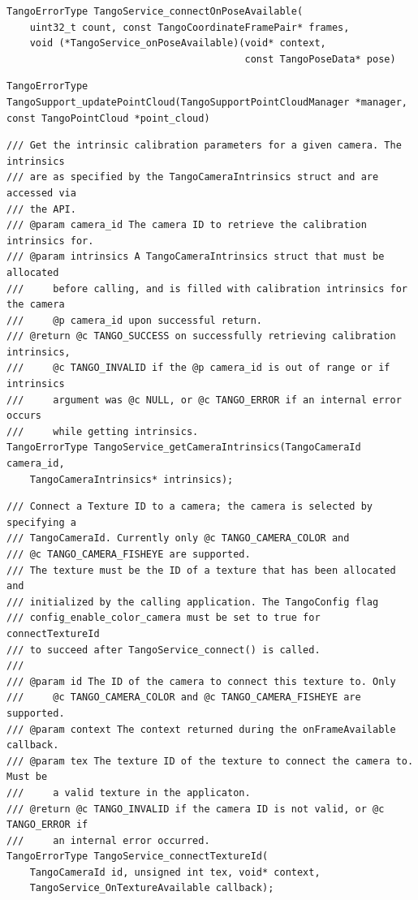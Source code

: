 \documentclass[12pt,twoside]{article}
\begin{document}
\begin{lstlisting}
TangoErrorType TangoService_connectOnPoseAvailable(
    uint32_t count, const TangoCoordinateFramePair* frames,
    void (*TangoService_onPoseAvailable)(void* context,
                                         const TangoPoseData* pose)
\end{lstlisting}

\begin{lstlisting}
TangoErrorType TangoSupport_updatePointCloud(TangoSupportPointCloudManager *manager, const TangoPointCloud *point_cloud)
\end{lstlisting}

\begin{lstlisting}
/// Get the intrinsic calibration parameters for a given camera. The intrinsics
/// are as specified by the TangoCameraIntrinsics struct and are accessed via
/// the API.
/// @param camera_id The camera ID to retrieve the calibration intrinsics for.
/// @param intrinsics A TangoCameraIntrinsics struct that must be allocated
///     before calling, and is filled with calibration intrinsics for the camera
///     @p camera_id upon successful return.
/// @return @c TANGO_SUCCESS on successfully retrieving calibration intrinsics,
///     @c TANGO_INVALID if the @p camera_id is out of range or if intrinsics
///     argument was @c NULL, or @c TANGO_ERROR if an internal error occurs
///     while getting intrinsics.
TangoErrorType TangoService_getCameraIntrinsics(TangoCameraId camera_id,
    TangoCameraIntrinsics* intrinsics);
\end{lstlisting}

\begin{lstlisting}
/// Connect a Texture ID to a camera; the camera is selected by specifying a
/// TangoCameraId. Currently only @c TANGO_CAMERA_COLOR and
/// @c TANGO_CAMERA_FISHEYE are supported.
/// The texture must be the ID of a texture that has been allocated and
/// initialized by the calling application. The TangoConfig flag
/// config_enable_color_camera must be set to true for connectTextureId
/// to succeed after TangoService_connect() is called.
///
/// @param id The ID of the camera to connect this texture to. Only
///     @c TANGO_CAMERA_COLOR and @c TANGO_CAMERA_FISHEYE are supported.
/// @param context The context returned during the onFrameAvailable callback.
/// @param tex The texture ID of the texture to connect the camera to. Must be
///     a valid texture in the applicaton.
/// @return @c TANGO_INVALID if the camera ID is not valid, or @c TANGO_ERROR if
///     an internal error occurred.
TangoErrorType TangoService_connectTextureId(
    TangoCameraId id, unsigned int tex, void* context,
    TangoService_OnTextureAvailable callback);
\end{lstlisting}
\end{document}
